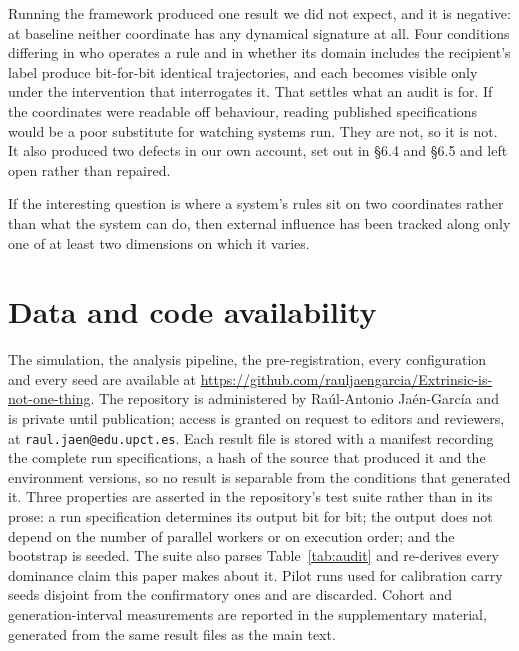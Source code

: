 \documentclass[review,3p,times]{elsarticle}
\newcommand{\repourl}{\url{https://github.com/rauljaengarcia/Extrinsic-is-not-one-thing}}
\begin{document}
Running the framework produced one result we did not expect, and it is
negative: at baseline neither coordinate has any dynamical signature at all.
Four conditions differing in who operates a rule and in whether its domain
includes the recipient's label produce bit-for-bit identical trajectories, and
each becomes visible only under the intervention that interrogates it. That
settles what an audit is for. If the coordinates were readable off behaviour,
reading published specifications would be a poor substitute for watching
systems run. They are not, so it is not. It also produced two defects in our
own account, set out in \S6.4 and \S6.5 and left open rather than repaired.

If the interesting question is where a system's rules sit on two
coordinates rather than what the system can do, then external influence has
been tracked along only one of at least two dimensions on which it varies.

\section*{Data and code availability}

The simulation, the analysis pipeline, the pre-registration, every
configuration and every seed are available at \repourl. The repository is
administered by Ra\'ul-Antonio Ja\'en-Garc\'ia and is private until
publication; access is granted on request to editors and reviewers, at
\texttt{raul.jaen@edu.upct.es}. Each
result file is stored with a manifest recording the complete run
specifications, a hash of the source that produced it and the environment
versions, so no result is separable from the conditions that generated it.
Three properties are asserted in the repository's test suite rather than in its
prose: a run specification determines its output bit for bit; the output does
not depend on the number of parallel workers or on execution order; and the
bootstrap is seeded. The suite also parses Table~\ref{tab:audit} and re-derives
every dominance claim this paper makes about it. Pilot runs used for
calibration carry seeds disjoint from the confirmatory ones and are discarded.
Cohort and generation-interval measurements are reported in the supplementary
material, generated from the same result files as the main text.
\end{document}
